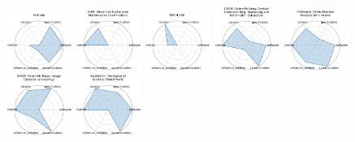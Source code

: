 \begin{figure}[ht!]
\\[1ex]
\includegraphics[width=0.1900\textwidth]{images/scicode_radar.pdf}
\includegraphics[width=0.1900\textwidth]{images/aime_american_invitational_mathematics_examination_radar.pdf}
\includegraphics[width=0.1900\textwidth]{images/math-_radar.pdf}
\includegraphics[width=0.1900\textwidth]{images/curie_scientific_long-context_understanding_reasoning_and_information_extraction_radar.pdf}
\includegraphics[width=0.1900\textwidth]{images/feabench_finite_element_analysis_benchmark_radar.pdf}
\\[1ex]
\includegraphics[width=0.1900\textwidth]{images/spiqa_scientific_paper_image_question_answering_radar.pdf}
\includegraphics[width=0.1900\textwidth]{images/baisbench_biological_ai_scientist_benchmark_radar.pdf}

\end{figure}
